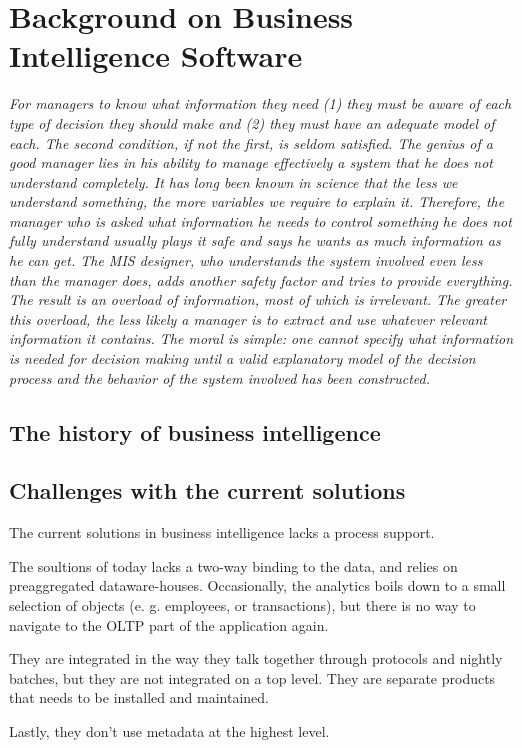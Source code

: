 \section{Background on Business Intelligence Software}
\label{sec:bi-background}
\textit{For managers to know what information they need (1) they must be aware of each type of decision they should make and (2) they must have an adequate model of each. The second condition, if not the first, is seldom satisfied. The genius of a good manager lies in his ability to manage effectively a system that he does not understand completely. It has long been known in science that the less we understand something, the more variables we require to explain it. Therefore, the manager who is asked what information he needs to control something he does not fully understand usually plays it safe and says he wants as much information as he can get. The MIS designer, who understands the system involved even less than the manager does, adds another safety factor and tries to provide everything. The result is an overload of information, most of which is irrelevant. The greater this overload, the less likely a manager is to extract and use whatever relevant information it contains. The moral is simple: one cannot specify what information is needed for decision making until a valid explanatory model of the decision process and the behavior of the system involved has been constructed.}


\subsection{The history of business intelligence}


\subsection{Challenges with the current solutions}
The current solutions in business intelligence lacks a process support.

The soultions of today lacks a two-way binding to the data, and relies on preaggregated dataware-houses. Occasionally, the analytics boils down to a small selection of objects (e. g. employees, or transactions), but there is no way to navigate to the OLTP part of the application again.

They are integrated in the way they talk together through protocols and nightly batches, but they are not integrated on a top level. They are separate products that needs to be installed and maintained.

Lastly, they don't use metadata at the highest level.
